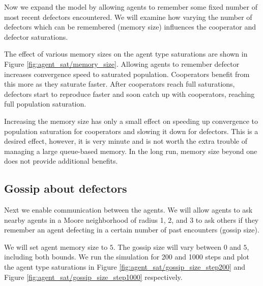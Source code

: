 \documentclass[english]{article}
\begin{document}
Now we expand the model by allowing agents to remember some fixed number of most recent defectors encountered. We will examine how varying the number of defectors which can be remembered (memory size) influences the cooperator and defector saturations.

The effect of various memory sizes on the agent type saturations are shown in Figure \ref{fig:agent_sat/memory_size}.
Allowing agents to remember defector increases convergence speed to saturated population.
Cooperators benefit from this more as they saturate faster.
After cooperators reach full saturations, defectors start to reproduce faster and soon catch up with cooperators, reaching full population saturation.

Increasing the memory size has only a small effect on speeding up convergence to population saturation for cooperators and slowing it down for defectors.
This is a desired effect, however, it is very minute and is not worth the extra trouble of managing a large queue-based memory.
In the long run, memory size beyond one does not provide additional benefits.


\subsection{Gossip about defectors}
Next we enable communication between the agents.
We will allow agents to ask nearby agents in a Moore neighborhood of radius 1, 2, and 3 to ask others if they remember an agent defecting in a certain number of past encounters (gossip size).

We will set agent memory size to $5$.
The gossip size will vary between $0$ and $5$, including both bounds.
We run the simulation for 200 and 1000 steps and plot the agent type saturations in Figure \ref{fig:agent_sat/gossip_size_step200} and Figure \ref{fig:agent_sat/gossip_size_step1000} respectively.
\end{document}
